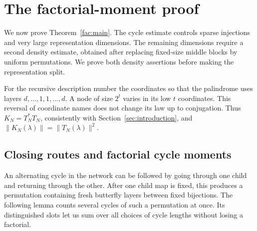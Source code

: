 \section{The factorial-moment proof}\label{sec:factorial}
We now prove Theorem~\ref{fac:main}. The cycle estimate controls sparse injections and very large representation dimensions. The remaining dimensions require a second density estimate, obtained after replacing fixed-size middle blocks by uniform permutations. We prove both density assertions before making the representation split.

For the recursive description number the coordinates so that the palindrome uses layers $d,\ldots,1,1,\ldots,d$. A node of size $2^t$ varies in its low $t$ coordinates. This reversal of coordinate names does not change its law up to conjugation. Thus $K_N=T_N^*T_N$, consistently with Section~\ref{sec:introduction}, and $\|K_N(\lambda)\|=\|T_N(\lambda)\|^2$.

\subsection{Closing routes and factorial cycle moments}
An alternating cycle in the network can be followed by going through one
child and returning through the other. After one child map is fixed, this
produces a permutation containing fresh butterfly layers between fixed
bijections. The following lemma counts several cycles of such a
permutation at once. Its distinguished slots let us sum over all choices
of cycle lengths without losing a factorial.

